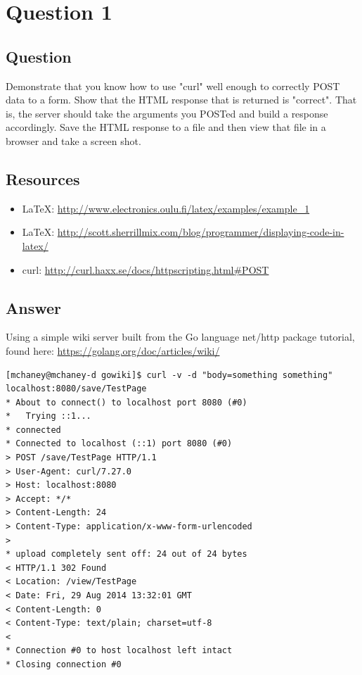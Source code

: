 \section{Question 1}

\subsection{Question}
Demonstrate that you know how to use "curl" well enough to 
correctly POST data to a form.  Show that the HTML response that
is returned is "correct".  That is, the server should take the
arguments you POSTed and build a response accordingly.  Save the
HTML response to a file and then view that file in a browser and
take a screen shot.

\subsection{Resources}
\begin{itemize}
\item \LaTeX: \url{http://www.electronics.oulu.fi/latex/examples/example_1}
\item \LaTeX: \url{http://scott.sherrillmix.com/blog/programmer/displaying-code-in-latex/}
\item curl: \url{http://curl.haxx.se/docs/httpscripting.html#POST}
\end{itemize}

\subsection{Answer}
Using a simple wiki server built from the Go language net/http package tutorial, found here: \url{https://golang.org/doc/articles/wiki/}
\begin{lstlisting}
[mchaney@mchaney-d gowiki]$ curl -v -d "body=something something" localhost:8080/save/TestPage
* About to connect() to localhost port 8080 (#0)
*   Trying ::1...
* connected
* Connected to localhost (::1) port 8080 (#0)
> POST /save/TestPage HTTP/1.1
> User-Agent: curl/7.27.0
> Host: localhost:8080
> Accept: */*
> Content-Length: 24
> Content-Type: application/x-www-form-urlencoded
> 
* upload completely sent off: 24 out of 24 bytes
< HTTP/1.1 302 Found
< Location: /view/TestPage
< Date: Fri, 29 Aug 2014 13:32:01 GMT
< Content-Length: 0
< Content-Type: text/plain; charset=utf-8
< 
* Connection #0 to host localhost left intact
* Closing connection #0
\end{lstlisting}

